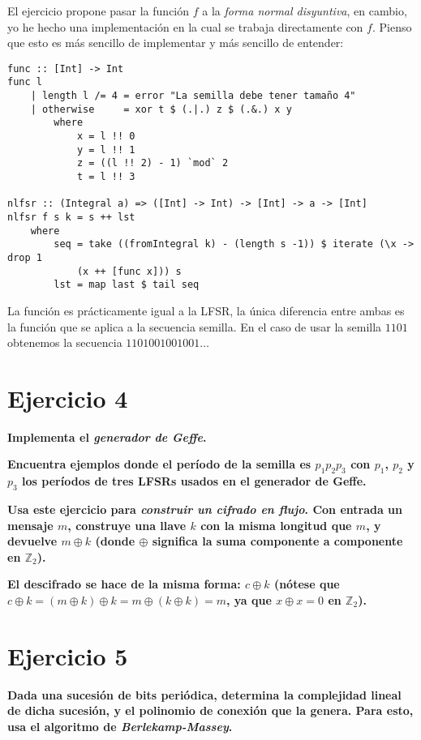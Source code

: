 \documentclass[10pt,spanish]{article}
\begin{document}
El ejercicio propone pasar la función $f$ a la \textit{\textcolor{azul}{forma normal disyuntiva}}, en cambio, yo he hecho una implementación en la cual se trabaja directamente con $f$. Pienso que esto es más sencillo de implementar y más sencillo de entender:

\begin{verbatim}
func :: [Int] -> Int
func l
    | length l /= 4 = error "La semilla debe tener tamaño 4"
    | otherwise     = xor t $ (.|.) z $ (.&.) x y
        where
            x = l !! 0
            y = l !! 1
            z = ((l !! 2) - 1) `mod` 2
            t = l !! 3

nlfsr :: (Integral a) => ([Int] -> Int) -> [Int] -> a -> [Int]
nlfsr f s k = s ++ lst
    where
        seq = take ((fromIntegral k) - (length s -1)) $ iterate (\x -> drop 1 
            (x ++ [func x])) s
        lst = map last $ tail seq

\end{verbatim}

La función es prácticamente igual a la LFSR, la única diferencia entre ambas es la función que se aplica a la secuencia semilla. En el caso de usar la semilla $1101$ obtenemos la secuencia $1101001001001\ldots$

\section{\textcolor{azul}Ejercicio 4}
\textbf{Implementa el \textit{\textcolor{azul}{generador de Geffe}}.}

\textbf{Encuentra ejemplos donde el período de la semilla es $p_1 p_2 p_3$ con $p_1$, $p_2$ y $p_3$ los períodos de tres LFSRs usados en el generador de Geffe.}

\textbf{Usa este ejercicio para \textit{\textcolor{azul}{construir un cifrado en flujo}}. Con entrada un mensaje $m$, construye una llave $k$ con la misma longitud que $m$, y devuelve $m \oplus k$ (donde $\oplus$ significa la suma componente a componente en $\mathbb{Z}_2$).}

\textbf{El descifrado se hace de la misma forma: $c \oplus k$ (nótese que $c \oplus k = (m \oplus k) \oplus k = m \oplus (k \oplus k) = m$, ya que $x \oplus x = 0$ en $\mathbb{Z}_2$).}

\section{\textcolor{azul}Ejercicio 5}
\textbf{Dada una sucesión de bits periódica, determina la complejidad lineal de dicha sucesión, y el polinomio de conexión que la genera. Para esto, usa el algoritmo de \textit{\textcolor{azul}{Berlekamp-Massey}}.}
\end{document}

